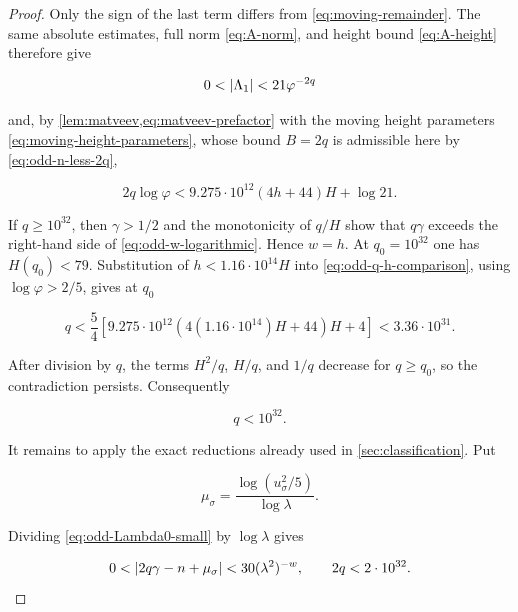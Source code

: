 \begin{proof}
Only the sign of the last term differs from
\cref{eq:moving-remainder}. The same absolute estimates, full norm
\cref{eq:A-norm}, and height bound \cref{eq:A-height} therefore give

\begin{equation}
 0<\lvert\Lambda_1\rvert<21\varphi^{-2q}
 \label{eq:odd-Lambda1-small}
\end{equation}

and, by \cref{lem:matveev,eq:matveev-prefactor} with the moving height
parameters \cref{eq:moving-height-parameters}, whose bound $B=2q$ is
admissible here by \cref{eq:odd-n-less-2q},

\begin{equation}
 2q\log\varphi
 <9.275\mathbin{\cdot}10^{12}(4h+44)H+\log21.
 \label{eq:odd-q-h-comparison}
\end{equation}

If $q\geqslant10^{32}$, then $\gamma>1/2$ and the monotonicity of $q/H$
show that $q\gamma$ exceeds the right-hand side of
\cref{eq:odd-w-logarithmic}. Hence $w=h$. At $q_0=10^{32}$ one has
$H(q_0)<79$. Substitution of
$h<1.16\mathbin{\cdot}10^{14}H$ into
\cref{eq:odd-q-h-comparison}, using $\log\varphi>2/5$, gives at $q_0$

\begin{equation}
 q<\frac54\left[
 9.275\mathbin{\cdot}10^{12}
 \left(4(1.16\mathbin{\cdot}10^{14})H+44\right)H+4
 \right]
 <3.36\mathbin{\cdot}10^{31}.
 \label{eq:odd-crude-contradiction}
\end{equation}

After division by $q$, the terms $H^2/q$, $H/q$, and $1/q$ decrease for
$q\geqslant q_0$, so the contradiction persists. Consequently

\begin{equation}
 q<10^{32}.
 \label{eq:odd-q-crude}
\end{equation}

It remains to apply the exact reductions already used in
\cref{sec:classification}. Put

\begin{equation}
 \mu_\sigma
 =\frac{\log(u_\sigma^2/5)}{\log\lambda}.
\end{equation}

Dividing \cref{eq:odd-Lambda0-small} by $\log\lambda$ gives

\begin{equation}
 0<\lvert2q\gamma-n+\mu_\sigma\rvert
 <30(\lambda^2)^{-w},
 \qquad
 2q<2\mathbin{\cdot}10^{32}.
 \label{eq:odd-fixed-reduction}
\end{equation}


\end{proof}
